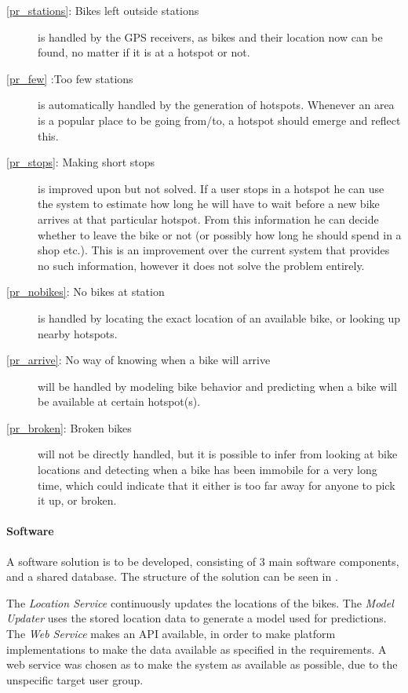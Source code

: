 \begin{description}
\item[\ref{pr_stations}: Bikes left outside stations] is handled by the GPS receivers, as bikes and their location now can be found, no matter if it is at a hotspot or not.

\item[\ref{pr_few} :Too few stations] is automatically handled by the generation of hotspots.
Whenever an area is a popular place to be going from/to, a hotspot should emerge and reflect this.

\item[\ref{pr_stops}: Making short stops] is improved upon but not solved.
If a user stops in a hotspot he can use the system to estimate how long he will have to wait before a new bike arrives at that particular hotspot.
From this information he can decide whether to leave the bike or not (or possibly how long he should spend in a shop etc.).
This is an improvement over the current system that provides no such information, however it does not solve the problem entirely.

\item[\ref{pr_nobikes}: No bikes at station] is handled by locating the exact location of an available bike, or looking up nearby hotspots.

\item[\ref{pr_arrive}: No way of knowing when a bike will arrive] will be handled by modeling bike behavior and predicting when a bike will be available at certain hotspot(s).

\item[\ref{pr_broken}: Broken bikes] will not be directly handled, but it is possible to infer from looking at bike locations and detecting when a bike has been immobile for a very long time, which could indicate that it either is too far away for anyone to pick it up, or broken.
\end{description}

\paragraph{Software}
A software solution is to be developed, consisting of 3 main software components, and a shared database.
The structure of the solution can be seen in .

The \textit{Location Service} continuously updates the locations of the bikes.
The \textit{Model Updater} uses the stored location data to generate a model used for predictions.
The \textit{Web Service} makes an API available, in order to make platform implementations to make the data available as specified in the requirements.
A web service was chosen as to make the system as available as possible, due to the unspecific target user group.

